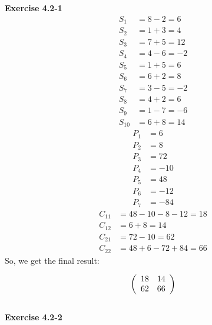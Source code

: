 \documentclass{article}
\begin{document}
\noindent\textbf{Exercise 4.2-1}\\

\begin{align*}
S_1 &= 8-2=6\\
S_2 &= 1+3 = 4\\
S_3 &=7+5 = 12\\
S_4 &=4-6 = -2\\
S_5 &=1+5=6\\
S_6 &=6+2=8\\
S_7 &=3-5=-2\\
S_8 &=4 +2=6\\
S_9 &=1-7 = -6\\
S_{10} &=6+8=14
\end{align*}
\begin{align*}
P_1 &=6\\
P_2 &=8\\
P_3 &=72\\
P_4 &=-10\\
P_5 &=48\\
P_6 &=-12\\
P_7 &=-84
\end{align*}
\begin{align*}
C_{11} &=48 -10-8-12 = 18\\
C_{12} &= 6+8 = 14\\
C_{21} &= 72-10 = 62\\
C_{22} &=48+6-72+84 = 66
\end{align*}
So, we get the final result:

\[
\left(\begin{array}{c c}18&14\\62&66\end{array}\right)
\]\\

\noindent\textbf{Exercise 4.2-2}\\
\end{document}
